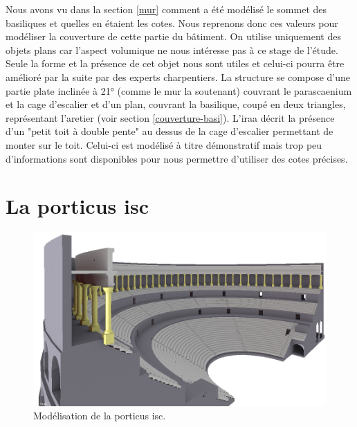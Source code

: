 Nous avons vu dans la section \ref{mur} comment a été modélisé le sommet des \glspl{basilique} et quelles en étaient les cotes. Nous reprenons donc ces valeurs pour modéliser la couverture de cette partie du bâtiment. On utilise uniquement des objets plans car l'aspect volumique ne nous intéresse pas à ce stage de l'étude. Seule la forme et la présence de cet objet nous sont utiles et celui-ci pourra être amélioré par la suite par des experts charpentiers. La structure se compose d'une partie plate inclinée à 21° (comme le mur la soutenant) couvrant le \gls{parascaenium} et la cage d'escalier et d'un plan, couvrant la \gls{basilique}, coupé en deux triangles, représentant l'\gls{aretier} (voir section \ref{couverture-basi}). L'\gls{iraa} décrit la présence d'un "petit toit à double pente" \cite[p. 34]{orangeTxt} au dessus de la cage d'escalier permettant de monter sur le toit. Celui-ci est modélisé à titre démonstratif mais trop peu d'informations sont disponibles pour nous permettre d'utiliser des cotes précises.


\section{La \gls{porticus isc}}

\begin{figure}[!h] \centering
	\includegraphics[width=\linewidth]{images/modPorticus}
	\caption{Modélisation de la \gls{porticus isc}.} 
	\label{modPorticus} 
\end{figure} 

